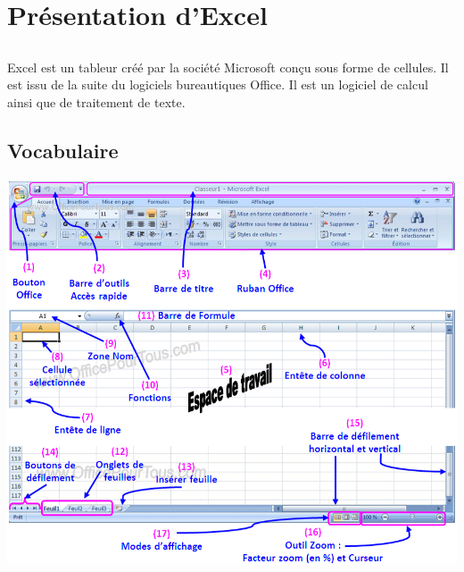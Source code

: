 \chapter{Présentation d’Excel}

\section*{}
Excel est un tableur créé par la société Microsoft conçu sous forme de cellules. Il est issu de la suite du logiciels bureautiques Office. Il est un logiciel de calcul  ainsi que de traitement de texte.
\section{Vocabulaire}  
 	\includegraphics[width=\linewidth]{img/interface}

